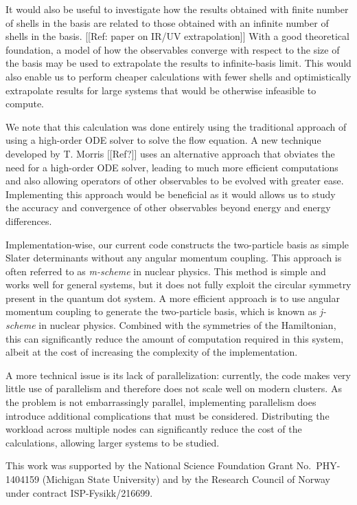 \documentclass[amsmath, amssymb, aps, floatfix, nofootinbib, preprintnumbers,showpacs, superscriptaddress, twocolumn]{revtex4-1}
\begin{document}
It would also be useful to investigate how the results obtained with finite
number of shells in the basis are related to those obtained with an infinite
number of shells in the basis.  [[Ref: paper on IR/UV extrapolation]] With a
good theoretical foundation, a model of how the observables converge with
respect to the size of the basis may be used to extrapolate the results to
infinite-basis limit.  This would also enable us to perform cheaper
calculations with fewer shells and optimistically extrapolate results for
large systems that would be otherwise infeasible to compute.

We note that this calculation was done entirely using the traditional approach
of using a high-order ODE solver to solve the flow equation.  A new technique
developed by T. Morris [[Ref?]] uses an alternative approach that obviates the
need for a high-order ODE solver, leading to much more efficient computations
and also allowing operators of other observables to be evolved with greater
ease.  Implementing this approach would be beneficial as it would allows us to
study the accuracy and convergence of other observables beyond energy and
energy differences.

Implementation-wise, our current code constructs the two-particle basis as
simple Slater determinants without any angular momentum coupling.  This
approach is often referred to as \textit{m-scheme} in nuclear physics.  This
method is simple and works well for general systems, but it does not fully
exploit the circular symmetry present in the quantum dot system.  A more
efficient approach is to use angular momentum coupling to generate the
two-particle basis, which is known as \textit{j-scheme} in nuclear physics.
Combined with the symmetries of the Hamiltonian, this can significantly reduce
the amount of computation required in this system, albeit at the cost of
increasing the complexity of the implementation.

A more technical issue is its lack of parallelization: currently, the code
makes very little use of parallelism and therefore does not scale well on
modern clusters.  As the problem is not embarrassingly parallel, implementing
parallelism does introduce additional complications that must be considered.
Distributing the workload across multiple nodes can significantly reduce the
cost of the calculations, allowing larger systems to be studied.

\begin{acknowledgments}
 This work was supported by the
National Science Foundation Grant No.~PHY-1404159
(Michigan State University) and by the Research
Council of Norway under contract ISP-Fysikk/216699.
\end{acknowledgments}



\end{document}
